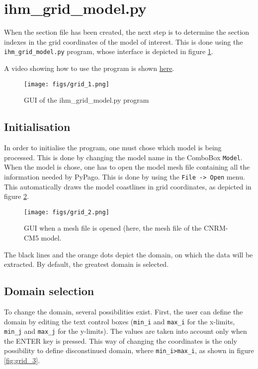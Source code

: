 \section{ihm\_grid\_model.py}

When the section file has been created, the next step is to determine
the section indexes in the grid coordinates of the model of
interest. This is done using the \verb+ihm_grid_model.py+ program,
whose interface is depicted in figure \ref{fig:grid_1}.

A video showing how to use the program is shown \href{https://dl.dropboxusercontent.com/u/99128427/Site/barriernicolas/Python_NCL_files/video_ihm_grid_model.mov}{here}.

\begin{figure}[h!]
\centering
\texttt{[image: figs/grid\_1.png]}
\caption{GUI of the ihm\_grid\_model.py program}
\label{fig:grid_1}
\end{figure}

\subsection{Initialisation}

In order to initialise the program, one must chose which model is
being processed. This is done by changing the model name in the
ComboBox \verb+Model+. When the model is chose, one has to open the
model mesh file containing all the information needed by PyPago. This
is done by using the \verb+File -> Open+ menu.\\

This automatically draws the model coastlines in grid coordinates, as
depicted in figure \ref{fig:grid_2}.

\begin{figure}[h!]
\centering
\texttt{[image: figs/grid\_2.png]}
\caption{GUI when a mesh file is opened (here, the mesh file of the
  CNRM-CM5 model.}
\label{fig:grid_2}
\end{figure}

The black lines and the orange dots depict the domain, on which the
data will be extracted. By default, the greatest domain is selected.

\subsection{Domain selection}

To change the domain, several possibilities exist. First, the user can
define the domain by editing the text control boxes (\verb+min_i+ and
\verb+max_i+ for the x-limits, \verb+min_j+ and
\verb+max_j+ for the y-limits). The values are taken into account only
when the ENTER key is pressed. This way of changing the coordinates is
the only possibility to define disconstinued domain, where
\verb+min_i>max_i+, as shown in figure \ref{fig:grid_3}.



